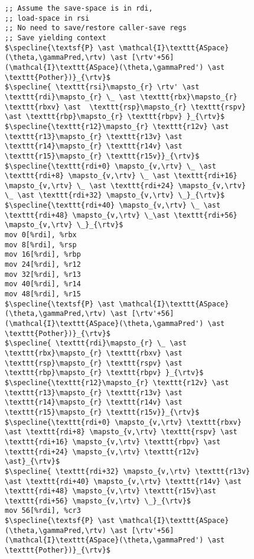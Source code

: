 
\begin{figure}\footnotesize
\begin{lstlisting}
;; Assume the save-space is in rdi,
;; load-space in rsi
;; No need to save/restore caller-save regs
;; Save yielding context
$\specline{\textsf{P} \ast \mathcal{I}\texttt{ASpace}(\theta,\gammaPred,\rtv) \ast [\rtv'+56](\mathcal{I}\texttt{ASpace}(\theta,\gammaPred') \ast \texttt{Pother})}_{\rtv}$
$\specline{ \texttt{rsi}\mapsto_{r} \rtv' \ast \texttt{rdi}\mapsto_{r} \_ \ast \texttt{rbx}\mapsto_{r} \texttt{rbxv} \ast  \texttt{rsp}\mapsto_{r} \texttt{rspv} \ast \texttt{rbp}\mapsto_{r} \texttt{rbpv} }_{\rtv}$
$\specline{\texttt{r12}\mapsto_{r} \texttt{r12v} \ast \texttt{r13}\mapsto_{r} \texttt{r13v} \ast \texttt{r14}\mapsto_{r} \texttt{r14v} \ast \texttt{r15}\mapsto_{r} \texttt{r15v}}_{\rtv}$
$\specline{\texttt{rdi+0} \mapsto_{v,\rtv} \_ \ast \texttt{rdi+8} \mapsto_{v,\rtv} \_ \ast \texttt{rdi+16} \mapsto_{v,\rtv} \_ \ast \texttt{rdi+24} \mapsto_{v,\rtv} \_ \ast \texttt{rdi+32} \mapsto_{v,\rtv} \_}_{\rtv}$
$\specline{\texttt{rdi+40} \mapsto_{v,\rtv} \_ \ast \texttt{rdi+48} \mapsto_{v,\rtv} \_\ast \texttt{rdi+56} \mapsto_{v,\rtv} \_}_{\rtv}$
mov 0[%rdi], %rbx
mov 8[%rdi], %rsp
mov 16[%rdi], %rbp
mov 24[%rdi], %r12
mov 32[%rdi], %r13
mov 40[%rdi], %r14
mov 48[%rdi], %r15
$\specline{\textsf{P} \ast \mathcal{I}\texttt{ASpace}(\theta,\gammaPred,\rtv) \ast [\rtv'+56](\mathcal{I}\texttt{ASpace}(\theta,\gammaPred') \ast \texttt{Pother})}_{\rtv}$
$\specline{ \texttt{rdi}\mapsto_{r} \_ \ast \texttt{rbx}\mapsto_{r} \texttt{rbxv} \ast  \texttt{rsp}\mapsto_{r} \texttt{rspv} \ast \texttt{rbp}\mapsto_{r} \texttt{rbpv} }_{\rtv}$
$\specline{\texttt{r12}\mapsto_{r} \texttt{r12v} \ast \texttt{r13}\mapsto_{r} \texttt{r13v} \ast \texttt{r14}\mapsto_{r} \texttt{r14v} \ast \texttt{r15}\mapsto_{r} \texttt{r15v}}_{\rtv}$
$\specline{\texttt{rdi+0} \mapsto_{v,\rtv} \texttt{rbxv} \ast \texttt{rdi+8} \mapsto_{v,\rtv} \texttt{rspv} \ast \texttt{rdi+16} \mapsto_{v,\rtv} \texttt{rbpv} \ast \texttt{rdi+24} \mapsto_{v,\rtv} \texttt{r12v} \ast}_{\rtv}$
$\specline{ \texttt{rdi+32} \mapsto_{v,\rtv} \texttt{r13v} \ast \texttt{rdi+40} \mapsto_{v,\rtv} \texttt{r14v} \ast \texttt{rdi+48} \mapsto_{v,\rtv} \texttt{r15v}\ast \texttt{rdi+56} \mapsto_{v,\rtv} \_}_{\rtv}$
mov 56[%rdi], %cr3
$\specline{\textsf{P} \ast \mathcal{I}\texttt{ASpace}(\theta,\gammaPred,\rtv) \ast [\rtv'+56](\mathcal{I}\texttt{ASpace}(\theta,\gammaPred') \ast \texttt{Pother})}_{\rtv}$

\end{lstlisting}
\end{figure}
